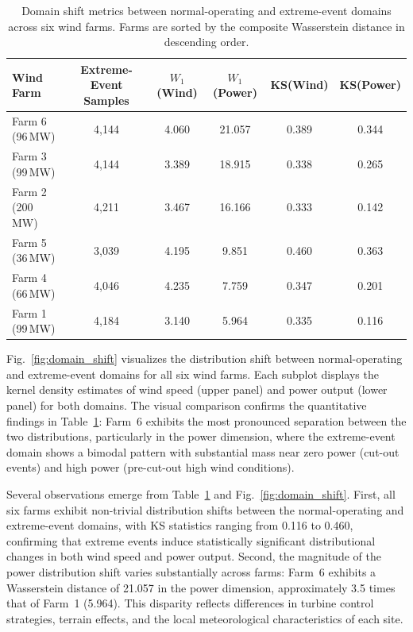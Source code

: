 \begin{table}[ht]
\centering
\caption{Domain shift metrics between normal-operating and extreme-event domains across six wind farms. Farms are sorted by the composite Wasserstein distance in descending order.}
\setlength{\tabcolsep}{3mm}
\begin{tabular}{lccccc}
\toprule
Wind Farm & Extreme-Event Samples & $W_1$(Wind) & $W_1$(Power) & KS(Wind) & KS(Power) \\
\midrule
Farm 6 (96\,MW)  & 4{,}144 & 4.060 & 21.057 & 0.389 & 0.344 \\
Farm 3 (99\,MW)  & 4{,}144 & 3.389 & 18.915 & 0.338 & 0.265 \\
Farm 2 (200\,MW) & 4{,}211 & 3.467 & 16.166 & 0.333 & 0.142 \\
Farm 5 (36\,MW)  & 3{,}039 & 4.195 &  9.851 & 0.460 & 0.363 \\
Farm 4 (66\,MW)  & 4{,}046 & 4.235 &  7.759 & 0.347 & 0.201 \\
Farm 1 (99\,MW)  & 4{,}184 & 3.140 &  5.964 & 0.335 & 0.116 \\
\bottomrule
\end{tabular}
\label{tab:exp1_shift}
\end{table}

Fig.~\ref{fig:domain_shift} visualizes the distribution shift between normal-operating and extreme-event domains for all six wind farms. Each subplot displays the kernel density estimates of wind speed (upper panel) and power output (lower panel) for both domains. The visual comparison confirms the quantitative findings in Table~\ref{tab:exp1_shift}: Farm~6 exhibits the most pronounced separation between the two distributions, particularly in the power dimension, where the extreme-event domain shows a bimodal pattern with substantial mass near zero power (cut-out events) and high power (pre-cut-out high wind conditions).

Several observations emerge from Table~\ref{tab:exp1_shift} and Fig.~\ref{fig:domain_shift}. First, all six farms exhibit non-trivial distribution shifts between the normal-operating and extreme-event domains, with KS statistics ranging from 0.116 to 0.460, confirming that extreme events induce statistically significant distributional changes in both wind speed and power output. Second, the magnitude of the power distribution shift varies substantially across farms: Farm~6 exhibits a Wasserstein distance of 21.057 in the power dimension, approximately 3.5 times that of Farm~1 (5.964). This disparity reflects differences in turbine control strategies, terrain effects, and the local meteorological characteristics of each site.


